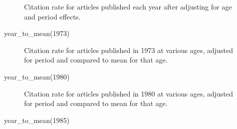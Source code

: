 \documentclass[
  10pt,
  letterpaper,
  DIV=11,
  numbers=noendperiod,
  twoside]{scrartcl}
\newenvironment{Shaded}{\begin{snugshade}}{\end{snugshade}}
\newcommand{\DecValTok}[1]{\textcolor[rgb]{0.68,0.00,0.00}{#1}}
\newcommand{\FunctionTok}[1]{\textcolor[rgb]{0.28,0.35,0.67}{#1}}
\newcommand{\NormalTok}[1]{\textcolor[rgb]{0.00,0.23,0.31}{#1}}
\begin{document}
\begin{figure}[H]


\caption{\label{fig-cohortsummary}Citation rate for articles published
each year after adjusting for age and period effects.}

\end{figure}%

\begin{Shaded}
\begin{Highlighting}[]
\FunctionTok{year\_to\_mean}\NormalTok{(}\DecValTok{1973}\NormalTok{)}
\end{Highlighting}
\end{Shaded}

\begin{figure}[H]


\caption{\label{fig-ytm1973}Citation rate for articles published in 1973
at various ages, adjusted for period and compared to mean for that age.}

\end{figure}%

\begin{Shaded}
\begin{Highlighting}[]
\FunctionTok{year\_to\_mean}\NormalTok{(}\DecValTok{1980}\NormalTok{)}
\end{Highlighting}
\end{Shaded}

\begin{figure}[H]


\caption{\label{fig-ytm1980}Citation rate for articles published in 1980
at various ages, adjusted for period and compared to mean for that age.}

\end{figure}%

\begin{Shaded}
\begin{Highlighting}[]
\FunctionTok{year\_to\_mean}\NormalTok{(}\DecValTok{1985}\NormalTok{)}
\end{Highlighting}
\end{Shaded}
\end{document}
